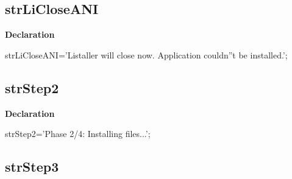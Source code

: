 \documentclass{report}
\newif\ifpdf
\begin{document}
\subsection*{strLiCloseANI}
\fi
\label{trstrings-strLiCloseANI}
\begin{list}{}{
\setlength{\itemindent}{0cm}
\setlength{\listparindent}{0cm}
\setlength{\leftmargin}{\evensidemargin}
\addtolength{\leftmargin}{\tmplength}
\settowidth{\labelsep}{X}
\addtolength{\leftmargin}{\labelsep}
\setlength{\labelwidth}{\tmplength}
}
\item[\textbf{Declaration}\hfill]
\ifpdf
\begin{flushleft}
\fi
\begin{ttfamily}
strLiCloseANI='Listaller will close now. Application couldn''t be installed.';\end{ttfamily}

\ifpdf
\end{flushleft}
\fi

\end{list}
\ifpdf
\subsection*{\large{\textbf{strStep2}}\normalsize\hspace{1ex}\hrulefill}
\else
\subsection*{strStep2}
\fi
\label{trstrings-strStep2}
\begin{list}{}{
\setlength{\itemindent}{0cm}
\setlength{\listparindent}{0cm}
\setlength{\leftmargin}{\evensidemargin}
\addtolength{\leftmargin}{\tmplength}
\settowidth{\labelsep}{X}
\addtolength{\leftmargin}{\labelsep}
\setlength{\labelwidth}{\tmplength}
}
\item[\textbf{Declaration}\hfill]
\ifpdf
\begin{flushleft}
\fi
\begin{ttfamily}
strStep2='Phase 2/4: Installing files...';\end{ttfamily}

\ifpdf
\end{flushleft}
\fi

\end{list}
\ifpdf
\subsection*{\large{\textbf{strStep3}}\normalsize\hspace{1ex}\hrulefill}
\else
\end{document}
